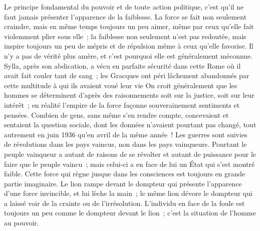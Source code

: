 \documentclass[french,twoside]{book} %
\begin{document}
Le principe fondamental du pouvoir et de toute action politique, c'est qu'il ne faut jamais présenter l'apparence de la faiblesse. La force se fait non seulement craindre, mais en même temps toujours un peu aimer, même par ceux qu'elle fait violemment plier sous elle ; la faiblesse non seulement n'est pas redoutée, mais inspire toujours un peu de mépris et de répulsion même à ceux qu'elle favorise. Il n'y a pas de vérité plus amère, et c'est pourquoi elle est généralement méconnue. Sylla, après son abdication, a vécu en parfaite sécurité dans cette Rome où il avait fait couler tant de sang ; les Gracques ont péri lâchement abandonnés par cette multitude à qui ils avaient voué leur vie On croit généralement que les hommes se déterminent d'après des raisonne­ments soit sur la justice, soit sur leur intérêt ; en réalité l'empire de la force façonne souverainement sentiments et pensées. Combien de gens, sans même s'en rendre compte, concevaient et sentaient la question sociale, dont les données n'avaient pourtant pas changé, tout autrement en juin 1936 qu'en avril de la même année ! Les guerres sont suivies de révolutions dans les pays vaincus, non dans les pays vainqueurs. Pourtant le peuple vainqueur a autant de raisons de se révolter et autant de puissance pour le faire que le peuple vaincu ; mais celui-ci a en face de lui un État qui s'est montré faible. Cette force qui règne jusque dans les consciences est toujours en grande partie imaginaire. Le lion rampe devant le dompteur qui présente l'apparence d'une force invincible, et lui lèche la main ; le même lion dévore le dompteur qui a laissé voir de la crainte ou de l'irrésolution. L'individu en face de la foule est toujours un peu comme le dompteur devant le lion ; c'est la situation de l'homme au pouvoir.\par

\begin{center}
\noindent \centerline{}
\end{center}
\end{document}
